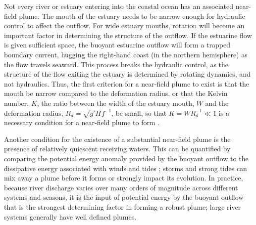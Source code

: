 \documentclass[12pt]{article}
\begin{document}


Not every river or estuary entering into the coastal ocean has an associated near-field plume. The mouth of the estuary needs to be narrow enough for hydraulic control to affect the outflow. For wide estuary mouths, rotation will become an important factor in determining the structure of the outflow. If the estuarine flow is given sufficient space, the buoyant estuarine outflow will form a trapped boundary current, hugging the right-hand coast (in the northern hemisphere) as the flow travels seaward. This process breaks the hydraulic control, as the structure of the flow exiting the estuary is determined by rotating dynamics, and not hydraulics. Thus, the first criterion for a near-field plume to exist is that the mouth be narrow compared to the deformation radius, or that the Kelvin number, $K$, the ratio between the width of the estuary mouth, $W$ and the deformation radius, $R_d = \sqrt{g' H} f^{-1}$, be small, so that $K = W R_d^{-1} \ll 1$ is a necessary condition for a near-field plume to form \citep{horner-devine.ea:15}.

Another condition for the existence of a substantial near-field plume is the presence of relatively quiescent receiving waters. This can be quantified by comparing the potential energy anomaly provided by the buoyant outflow to the dissipative energy associated with winds and tides \citep{pritchard.huntley:02}; storms and strong tides can mix away a plume before it forms or strongly impact its evolution. In practice, because river discharge varies over many orders of magnitude across different systems and seasons, it is the input of potential energy by the buoyant outflow that is the strongest determining factor in forming a robust plume; large river systems generally have well defined plumes.
\end{document}
